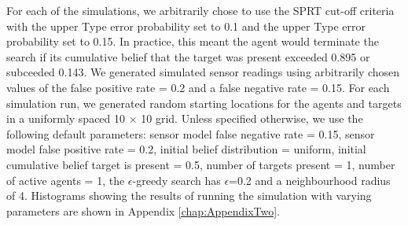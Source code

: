 \par For each of the simulations, we arbitrarily chose to use the SPRT cut-off criteria with the upper Type  error probability set to 0.1 and the upper Type  error probability set to 0.15. In practice, this meant the agent would terminate the search if its cumulative belief that the target was present exceeded 0.895 or subceeded 0.143. We generated simulated sensor readings using arbitrarily chosen values of the false positive rate = 0.2 and a false negative rate = 0.15. For each simulation run, we generated random starting locations for the agents and targets in a uniformly spaced 10 $\times$ 10 grid. Unless specified otherwise, we use the following default parameters: sensor model false negative rate = 0.15, sensor model false positive rate = 0.2, initial belief distribution = uniform, initial cumulative belief target is present = 0.5, number of targets present = 1, number of active agents = 1, the $\epsilon$-greedy search has $\epsilon$=0.2 and a neighbourhood radius of 4. Histograms showing the results of running the simulation with varying parameters are shown in Appendix \ref{chap:AppendixTwo}.





